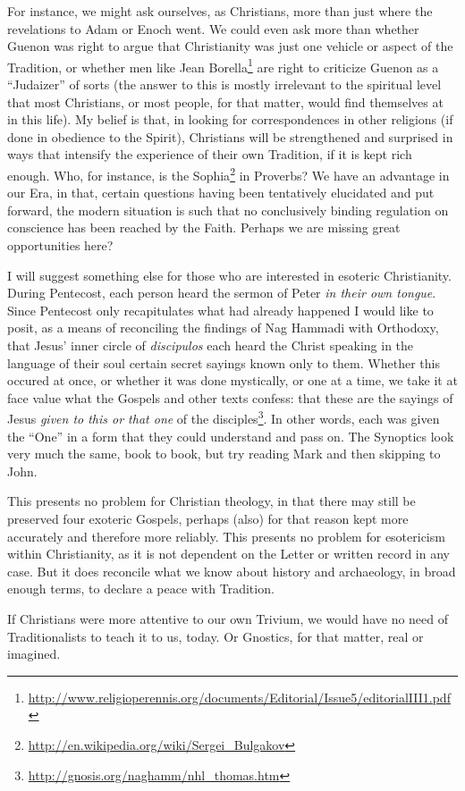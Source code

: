 For instance, we might ask ourselves, as Christians, more than just where the revelations to Adam or Enoch went. We could even ask more than whether Guenon was right to argue that Christianity was just one vehicle or aspect of the Tradition, or whether men like Jean Borella\footnote{\url{http://www.religioperennis.org/documents/Editorial/Issue5/editorialIII1.pdf}} are right to criticize Guenon as a ``Judaizer'' of sorts (the answer to this is mostly irrelevant to the spiritual level that most Christians, or most people, for that matter, would find themselves at in this life). My belief is that, in looking for correspondences in other religions (if done in obedience to the Spirit), Christians will be strengthened and surprised in ways that intensify the experience of their own Tradition, if it is kept rich enough. Who, for instance, is the Sophia\footnote{\url{http://en.wikipedia.org/wiki/Sergei\_Bulgakov}} in Proverbs? We have an advantage in our Era, in that, certain questions having been tentatively elucidated and put forward, the modern situation is such that no conclusively binding regulation on conscience has been reached by the Faith. Perhaps we are missing great opportunities here?

I will suggest something else for those who are interested in esoteric Christianity. During Pentecost, each person heard the sermon of Peter \emph{in their own tongue}. Since Pentecost only recapitulates what had already happened I would like to posit, as a means of reconciling the findings of Nag Hammadi with Orthodoxy, that Jesus' inner circle of \emph{discipulos} each heard the Christ speaking in the language of their soul certain secret sayings known only to them. Whether this occured at once, or whether it was done mystically, or one at a time, we take it at face value what the Gospels and other texts confess: that these are the sayings of Jesus \emph{given to this or that one} of the disciples\footnote{\url{http://gnosis.org/naghamm/nhl\_thomas.htm}}. In other words, each was given the ``One'' in a form that they could understand and pass on. The Synoptics look very much the same, book to book, but try reading Mark and then skipping to John.

This presents no problem for Christian theology, in that there may still be preserved four exoteric Gospels, perhaps (also) for that reason kept more accurately and therefore more reliably. This presents no problem for esotericism within Christianity, as it is not dependent on the Letter or written record in any case. But it does reconcile what we know about history and archaeology, in broad enough terms, to declare a peace with Tradition.

If Christians were more attentive to our own Trivium, we would have no need of Traditionalists to teach it to us, today. Or Gnostics, for that matter, real or imagined.



